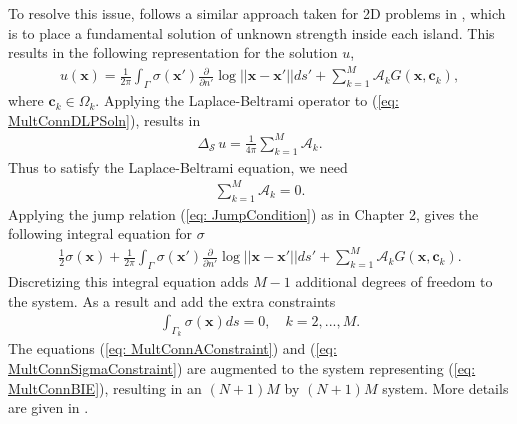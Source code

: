 \documentclass{sfuthesis}
\begin{document}
To resolve this issue, \cite{KropNig2014} follows a similar approach taken for 2D problems in \cite{GGM93}, which is to place a fundamental solution of unknown strength inside each island. This results in the following representation for the solution $u$, 
\begin{align}
	u(\mathbf{x})=\frac{1}{2\pi} \int_\Gamma \sigma(\mathbf{x}') \frac{\partial}{\partial n'} \log {||\mathbf{x}-\mathbf{x}'||}ds' + \sum_{k=1}^M \mathcal{A}_k G(\mathbf{x}, \mathbf{c}_k), 
	\label{eq: MultConnDLPSoln}
\end{align}
where $\mathbf{c}_k \in \Omega_k$. 
Applying the Laplace-Beltrami operator to (\ref{eq: MultConnDLPSoln}), results in 
\begin{align*}
	\Delta_{\mathcal{S} \ }u=\frac{1}{4\pi}\sum_{k=1}^M \mathcal{A}_k.
\end{align*}
Thus to satisfy the Laplace-Beltrami equation, we need 
\begin{align}
	\sum_{k=1}^M\mathcal{A}_k =0. \label{eq: MultConnAConstraint} 
\end{align}
Applying the jump relation (\ref{eq: JumpCondition}) as in Chapter 2, gives the following integral equation for $\sigma$ 
\begin{align}
	\frac{1}{2}\sigma(\mathbf{x})+\frac{1}{2\pi} \int_{\Gamma} \sigma(\mathbf{x}') \frac{\partial}{\partial n'} \log {||\mathbf{x}-\mathbf{x}'||} ds' + \sum_{k=1}^M \mathcal{A}_k G(\mathbf{x}, \mathbf{c}_k). \label{eq: MultConnBIE} 
\end{align}
Discretizing this integral equation adds $M-1$ additional degrees of freedom to the system. As a result \cite{KropNig2014} and \cite{GGM93} add the extra constraints 
\begin{align}
	\int_{\Gamma_k} \sigma(\mathbf{x})ds =0, \quad k=2,..., M. \label{eq: MultConnSigmaConstraint} 
\end{align}
The equations (\ref{eq: MultConnAConstraint}) and (\ref{eq: MultConnSigmaConstraint}) are augmented to the system representing (\ref{eq: MultConnBIE}), resulting in an $(N+1)M$ by $(N+1)M$ system. More details are given in \cite{KropNig2014, GGM93}.
\end{document}

